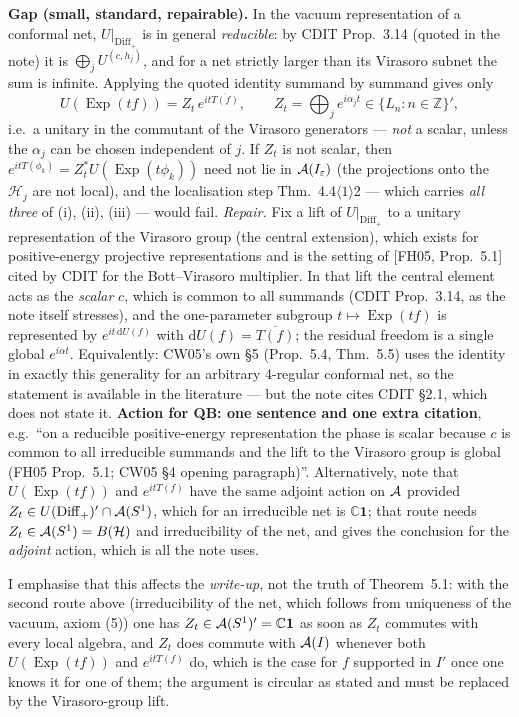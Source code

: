 \documentclass[11pt]{article}
\newcommand{\Hil}{\mathcal H}
\newcommand{\Diff}{\mathrm{Diff}_+}
\newcommand{\Exp}{\operatorname{Exp}}
\begin{document}
\begin{verdictgap}
\textbf{Gap (small, standard, repairable).}  In the vacuum representation of a conformal net, $U|_{\Diff}$ is in
general \emph{reducible}: by CDIT Prop.~3.14 (quoted in the note) it is $\bigoplus_jU^{(c,h_j)}$, and for a net
strictly larger than its Virasoro subnet the sum is infinite.  Applying the quoted identity summand by summand
gives only
\[
 U(\Exp(tf))=Z_t\,e^{it\overline{T(f)}},\qquad Z_t=\bigoplus\nolimits_je^{i\alpha_j t}\in\{L_n:n\in\mathbb Z\}',
\]
i.e.\ a unitary in the commutant of the Virasoro generators --- \emph{not} a scalar, unless the $\alpha_j$ can
be chosen independent of $j$.  If $Z_t$ is not scalar, then $e^{itT(\phi_k)}=Z_t^*U(\Exp(t\phi_k))$ need not lie
in $\mathcal A(I_\varepsilon)$ (the projections onto the $\Hil_j$ are not local), and the localisation step
Thm.~4.4$\langle1\rangle$2 --- which carries \emph{all three} of (i), (ii), (iii) --- would fail.
\emph{Repair.}  Fix a lift of $U|_{\Diff}$ to a unitary representation of the Virasoro group (the central
extension), which exists for positive-energy projective representations and is the setting of
[FH05, Prop.~5.1] cited by CDIT for the Bott--Virasoro multiplier.  In that lift the central element acts as the
\emph{scalar} $c$, which is common to all summands (CDIT Prop.~3.14, as the note itself stresses), and the
one-parameter subgroup $t\mapsto\Exp(tf)$ is represented by $e^{it\,\mathrm dU(f)}$ with
$\mathrm dU(f)=\overline{T(f)}$; the residual freedom is a single global $e^{i\alpha t}$.  Equivalently: CW05's
own \S5 (Prop.~5.4, Thm.~5.5) uses the identity in exactly this generality for an arbitrary 4-regular
conformal net, so the statement is available in the literature --- but the note cites CDIT \S2.1, which does
not state it.  \textbf{Action for QB: one sentence and one extra citation}, e.g.\ ``on a reducible
positive-energy representation the phase is scalar because $c$ is common to all irreducible summands and the
lift to the Virasoro group is global (FH05 Prop.~5.1; CW05 \S4 opening paragraph)''.  Alternatively, note that
$U(\Exp(tf))$ and $e^{itT(f)}$ have the same adjoint action on $\mathcal A$ provided $Z_t\in U(\Diff)'\cap
\cA(S^1)$, which for an irreducible net is $\mathbb C\mathbf 1$; that route needs $Z_t\in\cA(S^1)=B(\Hil)$ and
irreducibility of the net, and gives the conclusion for the \emph{adjoint} action, which is all the note uses.
\end{verdictgap}

I emphasise that this affects the \emph{write-up}, not the truth of Theorem~5.1: with the second route above
(irreducibility of the net, which follows from uniqueness of the vacuum, axiom (5)) one has
$Z_t\in\mathcal A(S^1)'=\mathbb C\mathbf 1$ as soon as $Z_t$ commutes with every local algebra, and $Z_t$ does commute with
$\mathcal A(I)$ whenever both $U(\Exp(tf))$ and $e^{itT(f)}$ do, which is the case for $f$ supported in $I'$ once one
knows it for one of them; the argument is circular as stated and must be replaced by the Virasoro-group lift.
\end{document}
